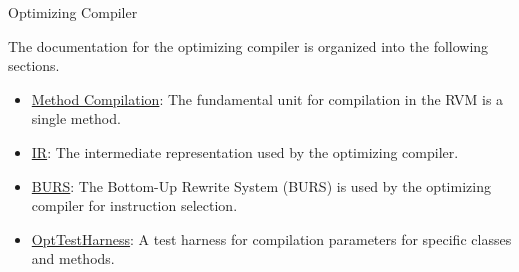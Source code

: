\begin{section}{Optimizing Compiler}
\label{sec:optimizingcompiler}

The documentation for the optimizing compiler is organized into the following sections.

\begin{itemize}
  \item \hyperref[subsec:methodcompilation]{Method Compilation}: The fundamental unit for compilation in the RVM is a single method.
  \item \hyperref[subsec:ir]{IR}: The intermediate representation used by the optimizing compiler.
  \item \hyperref[subsec:burs]{BURS}: The Bottom-Up Rewrite System (BURS) is used by the optimizing compiler for instruction selection.
  \item \hyperref[subsec:opttestharness]{OptTestHarness}: A test harness for compilation parameters for specific classes and methods.
\end{itemize}

\end{section}
